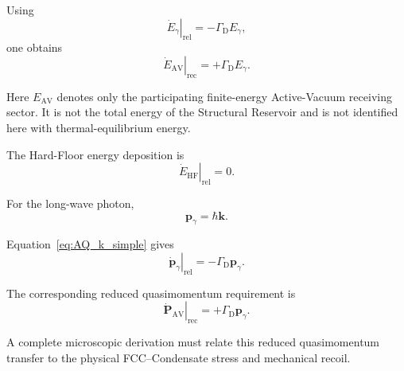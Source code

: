 Using
\begin{equation}
    \left.\dot E_{\gamma}\right|_{\mathrm{rel}}
    =
    -\Gamma_{\mathrm D}E_{\gamma},
\end{equation}
one obtains
\begin{equation}
    \boxed{
    \left.\dot E_{\mathrm{AV}}\right|_{\mathrm{rec}}
    =
    +\Gamma_{\mathrm D}E_{\gamma}.
    }
    \label{eq:AQ_AV_energy}
\end{equation}

Here $E_{\mathrm{AV}}$ denotes only the participating finite-energy
Active-Vacuum receiving sector. It is not the total energy of the Structural
Reservoir and is not identified here with thermal-equilibrium energy.

The Hard-Floor energy deposition is
\begin{equation}
    \boxed{
    \left.\dot E_{\mathrm{HF}}\right|_{\mathrm{rel}}
    =
    0.
    }
    \label{eq:AQ_HF_energy}
\end{equation}

For the long-wave photon,
\begin{equation}
    \mathbf{p}_{\gamma}
    =
    \hbar\mathbf{k}.
\end{equation}

Equation~\eqref{eq:AQ_k_simple} gives
\begin{equation}
    \left.\dot{\mathbf{p}}_{\gamma}\right|_{\mathrm{rel}}
    =
    -\Gamma_{\mathrm D}\mathbf{p}_{\gamma}.
\end{equation}

The corresponding reduced quasimomentum requirement is
\begin{equation}
    \boxed{
    \left.\dot{\mathbf P}_{\mathrm{AV}}\right|_{\mathrm{rec}}
    =
    +\Gamma_{\mathrm D}
    \mathbf{p}_{\gamma}.
    }
    \label{eq:AQ_momentum_balance}
\end{equation}

A complete microscopic derivation must relate this reduced quasimomentum
transfer to the physical FCC--Condensate stress and mechanical recoil.

